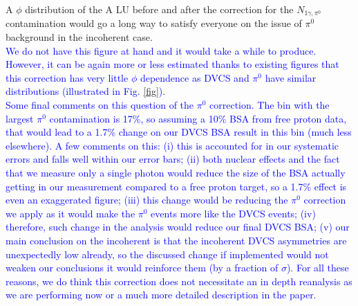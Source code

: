 \documentclass[a4paper,11pt,twoside]{article}
\begin{document}
A $\phi$ distribution of the A LU before and after the correction for the $N_{1\gamma,\pi^0}$ contamination would go a long way
to satisfy everyone on the issue of $\pi^0$ background in the incoherent case.\\
 \textcolor{blue}{ We do not have this figure at hand and it would take a while to produce. However, it can be again more or less estimated thanks to existing figures that this correction has very little $\phi$ dependence as DVCS and $\pi^0$ have similar distributions (illustrated in Fig. \ref{fig}). } \\

 \textcolor{blue}{Some final comments on this question of the $\pi^0$ correction. The bin with the largest $\pi^0$ contamination is 17\%, so assuming a 10\% BSA from free proton data, that would lead to a 1.7\% change on our DVCS BSA result in this bin (much less elsewhere). A few comments on this: (i) this is accounted for in our systematic errors and falls well within our error bars; (ii) both nuclear effects and the fact that we measure only a single photon would reduce the size of the BSA actually getting in our measurement compared to a free proton target, so a 1.7\% effect is even an exaggerated figure; (iii) this change would be reducing the $\pi^0$ correction we apply as it would make the $\pi^0$ events more like the DVCS events; (iv) therefore, such change in the analysis would reduce our final DVCS BSA; (v) our main conclusion on the incoherent is that the incoherent DVCS asymmetries are unexpectedly low already, so the discussed change if implemented would not weaken our conclusions it would reinforce them (by a fraction of $\sigma$). For all these reasons, we do think this correction does not necessitate an in depth reanalysis as we are performing now or a much more detailed description in the paper.}
\end{document}

